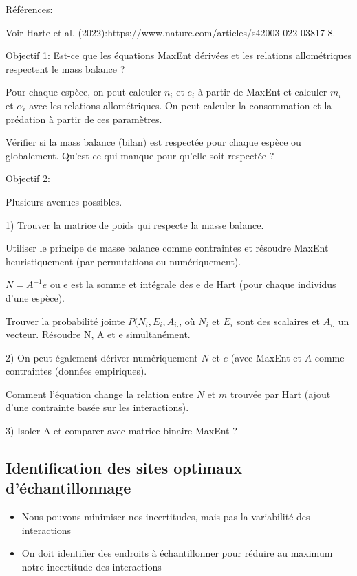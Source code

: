 Références:

Voir Harte et al. (2022):https://www.nature.com/articles/s42003-022-03817-8.

Objectif 1: Est-ce que les équations MaxEnt dérivées et les relations allométriques
respectent le mass balance ? 

Pour chaque espèce, on peut calculer $n_i$ et $e_i$ à partir de MaxEnt et
calculer $m_i$ et $\alpha_i$ avec les relations allométriques. On peut calculer
la consommation et la prédation à partir de ces paramètres. 

Vérifier si la mass balance (bilan) est respectée pour chaque espèce ou
globalement. Qu'est-ce qui manque pour qu'elle soit respectée ? 


Objectif 2: 

Plusieurs avenues possibles. 

1) Trouver la matrice de poids qui respecte la masse balance. 

Utiliser le principe de masse balance comme contraintes et résoudre MaxEnt
heuristiquement (par permutations ou numériquement). 

$N = A^{-1} e$ ou e est la somme et intégrale des e de Hart (pour chaque
individus d'une espèce). 

Trouver la probabilité jointe $P(N_i, E_i, A_{i.}$, où $N_i$ et $E_i$ sont des
scalaires et $A_{i.}$ un vecteur. Résoudre N, A et e simultanément. 

2) On peut également dériver numériquement $N$ et $e$ (avec MaxEnt et $A$ comme
contraintes (données empiriques). 

Comment l'équation change la relation entre $N$ et $m$ trouvée par Hart (ajout
d'une contrainte basée sur les interactions). 

3) Isoler A et comparer avec matrice binaire MaxEnt ?


\subsection{Identification des sites optimaux d'échantillonnage} 

\begin{itemize}
    \item Nous pouvons minimiser nos incertitudes, mais pas la variabilité des interactions
    \item On doit identifier des endroits à échantillonner pour réduire au maximum notre incertitude des interactions
\end{itemize}


